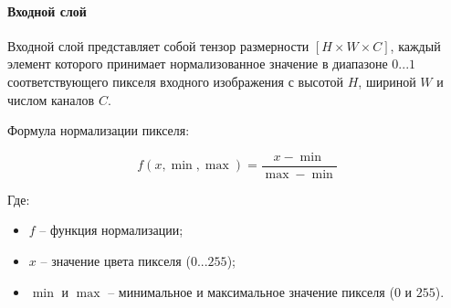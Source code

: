 \paragraph{Входной слой}

Входной слой представляет собой тензор размерности $\left[H\times W\times C\right]$, каждый элемент которого принимает нормализованное значение в диапазоне $0...1$ соответствующего пикселя входного изображения с высотой $H$, шириной $W$ и числом каналов $C$. 

Формула нормализации пикселя:

$$
f(x, \min, \max) = \frac{x-\min}{\max - \min}
$$

Где:
\begin{itemize}
    \item $f$ -- функция нормализации;
    \item $x$ -- значение цвета пикселя ($0...255$);
    \item $\min$ и $\max$ -- минимальное и максимальное значение пикселя ($0$ и $255$).
\end{itemize}
